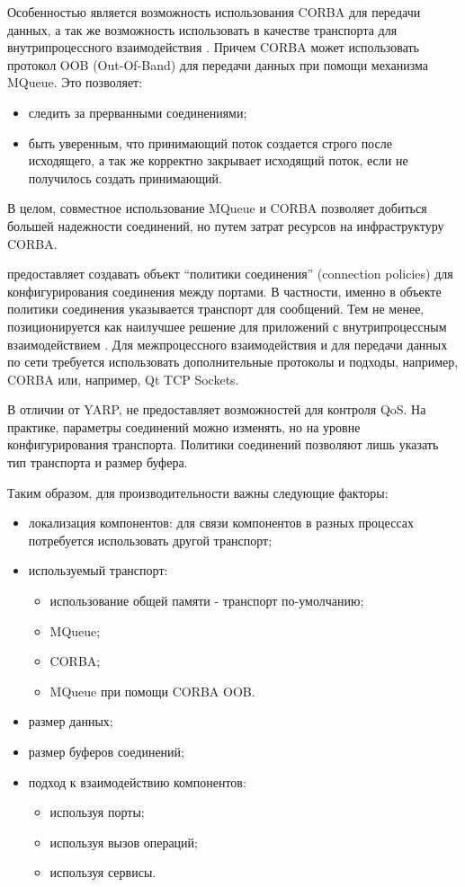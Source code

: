 Особенностью \orocos{} является возможность использования CORBA для передачи данных, а так же возможность использовать в качестве транспорта для внутрипроцессного взаимодействия . Причем CORBA может использовать протокол OOB (Out-Of-Band) для передачи данных при помощи механизма MQueue. Это позволяет:
\begin{itemize}[noitemsep]
	\item следить за прерванными соединениями;
	\item быть уверенным, что принимающий поток создается строго после исходящего, а так же корректно закрывает исходящий поток, если не получилось создать принимающий.
\end{itemize}
В целом, совместное использование MQueue и CORBA позволяет добиться большей надежности соединений, но путем затрат ресурсов на инфраструктуру CORBA.

\orocos{} предоставляет создавать объект \enquote{политики соединения} (connection policies) для конфигурирования соединения между портами. В частности, именно в объекте политики соединения указывается транспорт для сообщений. Тем не менее, \orocos{} позиционируется как наилучшее решение для приложений с внутрипроцессным взаимодействием \cite{orocos-interprocess-case}. Для межпроцессного взаимодействия и для передачи данных по сети требуется использовать дополнительные протоколы и подходы, например, CORBA или, например, Qt TCP Sockets.

В отличии от YARP, \toolchain{} не предоставляет возможностей для контроля QoS. На практике, параметры соединений можно изменять, но на уровне конфигурирования транспорта. Политики соединений позволяют лишь указать тип транспорта и размер буфера.

Таким образом, для производительности \rtt{} важны следующие факторы:
\begin{itemize}[noitemsep]
	\item локализация компонентов: для связи компонентов в разных процессах потребуется использовать другой транспорт;
	\item используемый транспорт:
	\begin{itemize}[noitemsep]
		\item использование общей памяти - транспорт по-умолчанию;
		\item MQueue;
		\item CORBA;
		\item MQueue при помощи CORBA OOB.
	\end{itemize}
	\item размер данных;
	\item размер буферов соединений;
	\item подход к взаимодействию компонентов:
	\begin{itemize}[noitemsep]
		\item используя порты;
		\item используя вызов операций;
		\item используя сервисы.
	\end{itemize}
\end{itemize}